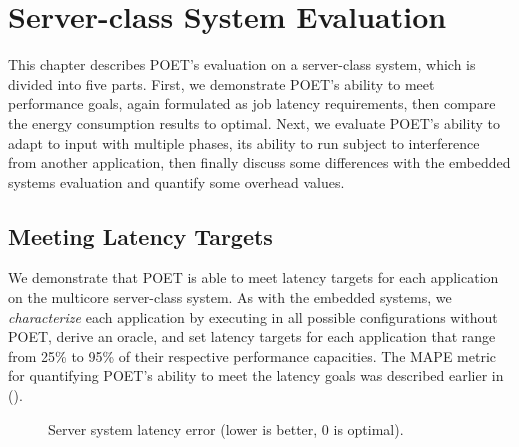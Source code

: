 \section{Server-class System Evaluation}
\label{sec:poet-server-evaluation}

This chapter describes POET's evaluation on a server-class system, which is divided into five parts.
First, we demonstrate POET's ability to meet performance goals, again formulated as job latency requirements, then compare the energy consumption results to optimal.
Next, we evaluate POET's ability to adapt to input with multiple phases, its ability to run subject to interference from another application, then finally discuss some differences with the embedded systems evaluation and quantify some overhead values.


\subsection{Meeting Latency Targets}

We demonstrate that POET is able to meet latency targets for each application on the multicore server-class system.
As with the embedded systems, we \emph{characterize} each application by executing in all possible configurations without POET, derive an oracle, and set latency targets for each application that range from 25\% to 95\% of their respective performance capacities.
The MAPE metric for quantifying POET's ability to meet the latency goals was described earlier in  ().

\begin{figure}[t]
  \centering
    
  \caption{Server system latency error (lower is better, 0 is optimal).}
  \label{fig:poet-mape-server}
\end{figure}

